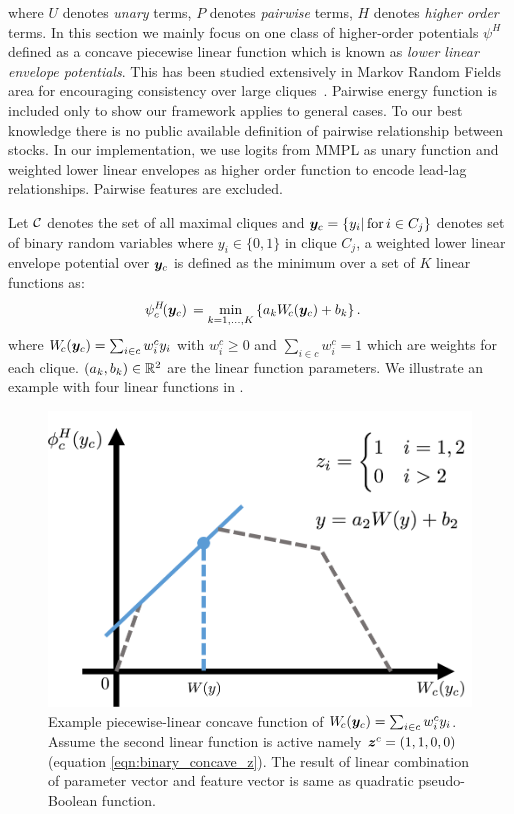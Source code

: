 \noindent where $U$ denotes \emph{unary} terms, $P$ denotes
\emph{pairwise} terms, $H$ denotes \emph{higher order} terms.
In this section we mainly focus on one class of higher-order
potentials $\psi^H$ defined as a concave piecewise linear
function which is known as \emph{lower linear envelope
  potentials}. This has been studied extensively in Markov Random
Fields area for encouraging consistency over large
cliques~\cite{Kohli:CVPR07,Nowozin:2011,Gould:ICML2011}. Pairwise energy function is included only to show our framework
applies to general cases. To our best knowledge there is
no public available definition of pairwise relationship between
stocks. In our implementation, we use logits from MMPL as unary
function and weighted lower linear envelopes as higher order
function to encode lead-lag relationships. Pairwise features are
excluded.

Let $\cal C$ denotes the set of all maximal cliques
and ${\bm{y}}_c=\{y_i |\text{\,for\,} i \in C_j\}$ denotes set of
binary random variables where $y_i\in \{0,1\}$ in clique $C_j$, a
weighted lower linear envelope potential over ${\bm{y}}_c$ is defined
as the minimum over a set of $K$ linear functions as:
%
\begin{align}
  \psi^H_c\!({\bm{y}}_c) \, &= \min_{k=1, \ldots, K} \left\{ a_k W_{\!c}({\bm{y}}_c) + b_k \right\}.
  \label{eqn:potential2}
\end{align}
%
where $W_{\!c}({\bm{y}}_c) = \sum_{i \in c} w_i^c y_i$ with $w^c_i \geq
0$ and $\sum_{i \in c} w^c_i = 1$ which are weights for each
clique. $(a_k, b_k) \in {\mathbb{R}}^2$ are the linear function
parameters. We illustrate an example with
four linear functions in .

\begin{figure}[t]
  \centering
  \includegraphics[width=0.8\columnwidth]{Methodology/figures/linEnvLatentFig.png}
  \caption{\label{fig:concave} Example piecewise-linear concave
    function of $W_{\!c}({\bm{y}}_c) = \sum_{i \in c} w^c_i y_i$.
    Assume the second linear function is active namely
    ${\bm{z}}^c=(1,1,0,0)$ (equation \ref{eqn:binary_concave_z}). The result of linear combination of
    parameter vector and feature vector is same as quadratic
    pseudo-Boolean function.}
\end{figure}

